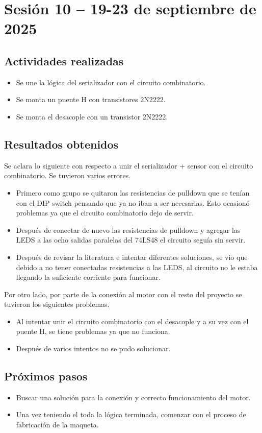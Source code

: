 \documentclass[12pt,letterpaper]{article}
\begin{document}
\section{Sesión 10 -- 19-23 de septiembre de 2025}
\subsection*{Actividades realizadas}
\begin{itemize}
    \item Se une la lógica del serializador con el circuito combinatorio.
    \item Se monta un puente H con transistores 2N2222.
    \item Se monta el desacople con un transistor 2N2222.
\end{itemize}

\subsection*{Resultados obtenidos}
Se aclara lo siguiente con respecto a unir el serializador + sensor con el circuito combinatorio. Se tuvieron varios errores.
\begin{itemize}
    \item Primero como grupo se quitaron las resistencias de pulldown que se tenían con el DIP switch pensando que ya no iban a ser necesarias. Esto ocasionó problemas ya que el circuito combinatorio dejo de servir.
    \item Después de conectar de nuevo las resistencias de pulldown y agregar las LEDS a las ocho salidas paralelas del 74LS48 el circuito seguía sin servir.
    \item Después de revisar la literatura e intentar diferentes soluciones, se vio que debido a no tener conectadas resistencias a las LEDS, al circuito no le estaba llegando la suficiente corriente para funcionar.
\end{itemize}

Por otro lado, por parte de la conexión al motor con el resto del proyecto se tuvieron los siguientes problemas.
\begin{itemize}
    \item Al intentar unir el circuito combinatorio con el desacople y a su vez con el puente H, se tiene problemas ya que no funciona.
    \item Después de varios intentos no se pudo solucionar.
\end{itemize}

\subsection*{Próximos pasos}
\begin{itemize}
    \item Buscar una solución para la conexión y correcto funcionamiento del motor.
    \item Una vez teniendo el toda la lógica terminada, comenzar con el proceso de fabricación de la maqueta.
\end{itemize}
\end{document}
